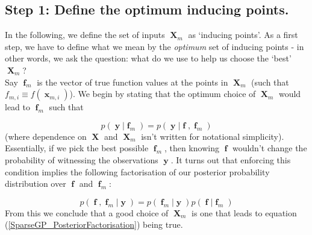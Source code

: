 \documentclass[a4paper, 11pt]{article}
\DeclareMathOperator{\x}{\boldsymbol{x}}
\DeclareMathOperator{\X}{\boldsymbol{X}}
\DeclareMathOperator{\y}{\boldsymbol{y}}
\DeclareMathOperator{\f}{\boldsymbol{f}}
\begin{document}
\begin{framed}
\subsection*{Step 1: Define the optimum inducing points.} 
In the following, we define the set of inputs $\X_m$ as `inducing points'. As a first step, we have to define what we mean by the \emph{optimum} set of inducing points - in other words, we ask the question: what do we use to help us choose the `best' $\X_m$? \\

Say $\f_m$ is the vector of true function values at the points in $\X_m$ (such that $f_{m,i} \equiv f(\x_{m,i})$). We begin by stating that the optimum choice of $\X_m$ would lead to $\f_m$ such that

\begin{equation}
	p(\y|\f_m) = p(\y|\f,\f_m)
\end{equation}
(where dependence on $\X$ and $\X_m$ isn't written for notational simplicity). Essentially, if we pick the best possible $\f_m$, then knowing $\f$ wouldn't change the probability of witnessing the observations $\y$. It turns out that enforcing this condition implies the following factorisation of our posterior probability distribution over $\f$ and $\f_m$:

\begin{equation}
	p(\f,\f_m|\y) = p(\f_m|\y)p(\f|\f_m)
	\label{SparseGP_PosteriorFactorisation}
\end{equation}
From this we conclude that a good choice of $\X_m$ is one that leads to equation (\ref{SparseGP_PosteriorFactorisation}) being true. 

\end{framed}
\end{document}
